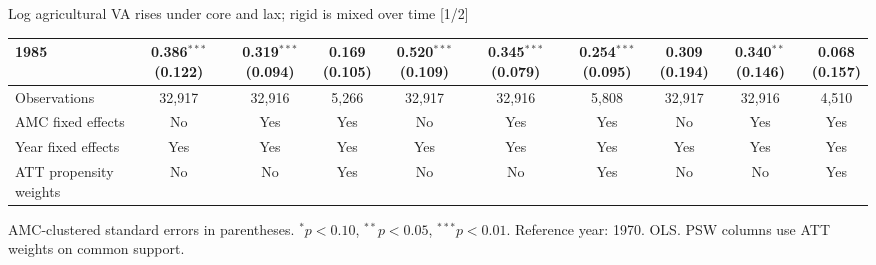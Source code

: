 \documentclass[aspectratio=169]{beamer}
\begin{document}
\begin{frame}{Log agricultural VA rises under core and lax; rigid is mixed over time [1/2]}
{\begin{tabular}{@{}l*{9}{c}@{}}
1985 & \shortstack{0.386$^{***}$\\(0.122)} & \shortstack{0.319$^{***}$\\(0.094)} & \shortstack{0.169\\(0.105)} & \shortstack{0.520$^{***}$\\(0.109)} & \shortstack{0.345$^{***}$\\(0.079)} & \shortstack{0.254$^{***}$\\(0.095)} & \shortstack{0.309\\(0.194)} & \shortstack{0.340$^{**}$\\(0.146)} & \shortstack{0.068\\(0.157)} \\
\midrule
Observations & 32,917 & 32,916 & 5,266 & 32,917 & 32,916 & 5,808 & 32,917 & 32,916 & 4,510 \\
AMC fixed effects & No & Yes & Yes & No & Yes & Yes & No & Yes & Yes \\
Year fixed effects & Yes & Yes & Yes & Yes & Yes & Yes & Yes & Yes & Yes \\
ATT propensity weights & No & No & Yes & No & No & Yes & No & No & Yes \\
\bottomrule
\end{tabular}%
}
\vspace{0.1em}
{\tiny\color{ZMidGray} AMC-clustered standard errors in parentheses. $^{*}p<0.10$, $^{**}p<0.05$, $^{***}p<0.01$. Reference year: 1970. OLS. PSW columns use ATT weights on common support.}
\end{frame}
\end{document}
